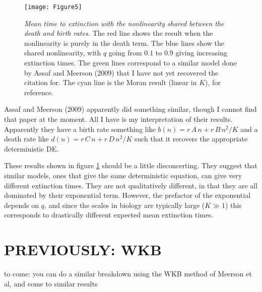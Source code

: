 \begin{figure}[ht]
\centering
\texttt{[image: Figure5]}
\caption{\emph{Mean time to extinction with the nonlinearity shared between the death and birth rates.}  The red line shows the result when the nonlinearity is purely in the death term.  The blue lines show the shared nonlinearity, with $q$ going from $0.1$ to $0.9$ giving increasing extinction times.  The green lines correspond to a similar model done by Assaf and Meerson (2009) that I have not yet recovered the citation for.  The cyan line is the Moran result (linear in $K$), for reference.  } \label{tauvK}
\end{figure}

Assaf and Meerson (2009) apparently did something similar, though I cannot find that paper at the moment.
All I have is my interpretation of their results.
Apparently they have a birth rate something like $b(n)=r\,A\,n + r\,B\,n^2/K$ and a death rate like $d(n)=r\,C\,n + r\,D\,n^2/K$ such that it recovers the appropriate deterministic DE.

These results shown in figure \ref{tauvK} should be a little disconcerting.
They suggest that similar models, ones that give the same deterministic equation, can give very different extinction times.
They are not qualitatively different, in that they are all dominated by their exponential term.
However, the prefactor of the exponential depends on $q$, and since the scales in biology are typically large ($K\gg1$) this corresponds to drastically different expected mean extinction times.


\section{PREVIOUSLY: WKB}
to come:  you can do a similar breakdown using the WKB method of Meerson et al, and come to similar results
